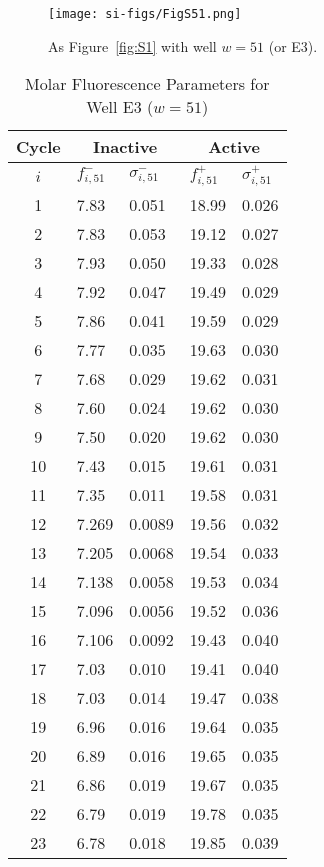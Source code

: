                 \begin{figure}
                    \centering
                    \texttt{[image: si-figs/FigS51.png]}
                    \caption{
                        As Figure~\ref{fig:S1} with well $w=51$ (or E3).
                    }
                \end{figure}
                \clearpage
    \begin{table}
        \caption{Molar Fluorescence Parameters for Well E3 ($w=51$)}
        \centering
        \begin{tabular}{c|ll|ll}
            Cycle & \multicolumn{2}{c|}{Inactive} & \multicolumn{2}{c}{Active} \\
            \hline
            $i$ & $f_{i,51}^{-}$ & $\sigma_{i,51}^{-}$ &  $f_{i,51}^{+}$ & $\sigma_{i,51}^{+}$ \\
            \hline
    1 & 7.83 & 0.051 & 18.99 & 0.026 \\
2 & 7.83 & 0.053 & 19.12 & 0.027 \\
3 & 7.93 & 0.050 & 19.33 & 0.028 \\
4 & 7.92 & 0.047 & 19.49 & 0.029 \\
5 & 7.86 & 0.041 & 19.59 & 0.029 \\
6 & 7.77 & 0.035 & 19.63 & 0.030 \\
7 & 7.68 & 0.029 & 19.62 & 0.031 \\
8 & 7.60 & 0.024 & 19.62 & 0.030 \\
9 & 7.50 & 0.020 & 19.62 & 0.030 \\
10 & 7.43 & 0.015 & 19.61 & 0.031 \\
11 & 7.35 & 0.011 & 19.58 & 0.031 \\
12 & 7.269 & 0.0089 & 19.56 & 0.032 \\
13 & 7.205 & 0.0068 & 19.54 & 0.033 \\
14 & 7.138 & 0.0058 & 19.53 & 0.034 \\
15 & 7.096 & 0.0056 & 19.52 & 0.036 \\
16 & 7.106 & 0.0092 & 19.43 & 0.040 \\
17 & 7.03 & 0.010 & 19.41 & 0.040 \\
18 & 7.03 & 0.014 & 19.47 & 0.038 \\
19 & 6.96 & 0.016 & 19.64 & 0.035 \\
20 & 6.89 & 0.016 & 19.65 & 0.035 \\
21 & 6.86 & 0.019 & 19.67 & 0.035 \\
22 & 6.79 & 0.019 & 19.78 & 0.035 \\
23 & 6.78 & 0.018 & 19.85 & 0.039 \\

\end{tabular}
\end{table}
